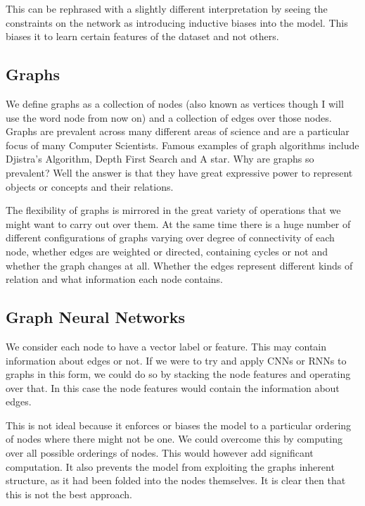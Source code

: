 \documentclass[]{../resources/final_report}
\begin{document}
This can be rephrased with a slightly different interpretation by seeing the constraints on
the network as introducing inductive biases into the model. This biases it to learn
certain features of the dataset and not others. 

\subsection{Graphs}

We define graphs as a collection of nodes (also known as vertices though I will use the word node from now on) 
and a collection of edges over those nodes.
Graphs are prevalent across many different areas of science and are a particular focus of
many Computer Scientists. Famous examples of graph algorithms include Djistra's Algorithm, Depth First Search and A star.
Why are graphs so prevalent? Well the answer is that they have great expressive power to 
represent objects or concepts and their relations.

The flexibility of graphs is mirrored in the great variety of operations that we might want 
to carry out over them. At the same time there is a huge number of different configurations 
of graphs varying over degree of connectivity of each node, whether edges are weighted or directed, 
containing cycles or not and whether the graph changes at all.
Whether the edges represent different kinds of relation and what information each node contains.

\subsection{Graph Neural Networks}

We consider each node to have a vector label or feature. This may contain information about edges or not.
If we were to try and apply CNNs or RNNs to graphs in this form, we could do so by stacking the node 
features and operating over that. In this case the node features would contain the information about edges.

This is not ideal because it enforces or biases the model to a particular ordering of nodes where there 
might not be one. We could overcome this by computing over all possible orderings of nodes.
This would however add significant computation. \cite{graphoverview}
It also prevents the model from exploiting the graphs inherent structure, as it had been 
folded into the nodes themselves. It is clear then that this is not the best approach.
\end{document}

